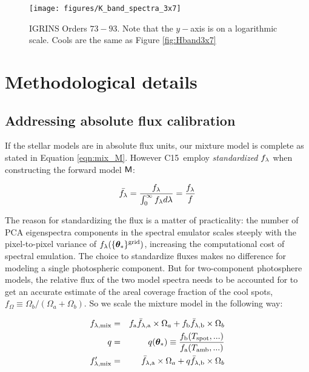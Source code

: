 \documentclass[12pt]{report}
\newcommand{\iancze}{{\sc C15}}
\begin{document}
\begin{figure*}
 \centering
 \texttt{[image: figures/K\_band\_spectra\_3x7]}
 \caption[$K-$band IGRINS spectra]{IGRINS Orders $73-93$.  Note that the $y-$axis is on a logarithmic scale.  Cools are the same as Figure \ref{fig:Hband3x7}}
 \label{fig:Kband3x7}
\end{figure*}


\section{Methodological details}
\label{methods-details}

\subsection{Addressing absolute flux calibration}
If the stellar models are in absolute flux units, our mixture model is complete as stated in Equation \ref{eqn:mix_M}.  However \iancze\ employ \emph{standardized} $f_\lambda$ when constructing the forward model $\mathsf{M}$:


\begin{eqnarray} \label{eqn:normalization}
\bar {f_\lambda} = \frac{f_\lambda}{\int_{0}^{\infty} f_\lambda d\lambda} = \frac{f_\lambda}{f}
\end{eqnarray}

The reason for standardizing the flux is a matter of practicality: the number of PCA eigenspectra components in the spectral emulator scales steeply with the pixel-to-pixel variance of $f_{\lambda}(\{{\bm \theta}_{\ast}\}^\textrm{grid})$, increasing the computational cost of spectral emulation.  The choice to standardize fluxes makes no difference for modeling a single photospheric component.  But for two-component photosphere models, the relative flux of the two model spectra needs to be accounted for to get an accurate estimate of the areal coverage fraction of the cool spots, $f_{\Omega} \equiv \Omega_b/(\Omega_a+\Omega_b)$.  So we scale the mixture model in the following way:

\begin{eqnarray} \label{eqn:norm_scaling}
f_{\lambda, \mathrm{mix}} &=& f_{\mathrm{a}} \bar f_{\lambda, \mathrm{a}} \times \Omega_a + f_{\mathrm{b}} \bar f_{\lambda, \mathrm{b}} \times \Omega_b \\
q &=& q({\bm \theta}_{\ast})\equiv \frac{f_{\mathrm{b}}(T_\textrm{spot}, ...)}{f_{\mathrm{a}}(T_\textrm{amb}, ...)} \\
f_{\lambda, \mathrm{mix}}^{\prime} &=& \bar f_{\lambda, \mathrm{a}} \times \Omega_a + q \bar f_{\lambda, \mathrm{b}} \times \Omega_b
\end{eqnarray}
\end{document}
